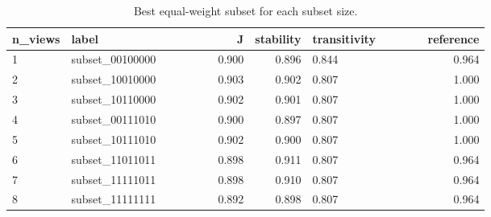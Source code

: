 \begin{table}[htbp]
\centering\scriptsize
\caption{Best equal-weight subset for each subset size.}
\label{tab:best_subset_per_size}
\setlength{\tabcolsep}{3pt}
\begin{tabular}{lp{0.381\linewidth}rrp{0.305\linewidth}r}
\toprule
n\_\allowbreak{}views & label & J & stability & transitivity & reference \\
\midrule
1 & subset\_\allowbreak{}00100000 & 0.900 & 0.896 & 0.844 & 0.964 \\
2 & subset\_\allowbreak{}10010000 & 0.903 & 0.902 & 0.807 & 1.000 \\
3 & subset\_\allowbreak{}10110000 & 0.902 & 0.901 & 0.807 & 1.000 \\
4 & subset\_\allowbreak{}00111010 & 0.900 & 0.897 & 0.807 & 1.000 \\
5 & subset\_\allowbreak{}10111010 & 0.902 & 0.900 & 0.807 & 1.000 \\
6 & subset\_\allowbreak{}11011011 & 0.898 & 0.911 & 0.807 & 0.964 \\
7 & subset\_\allowbreak{}11111011 & 0.898 & 0.910 & 0.807 & 0.964 \\
8 & subset\_\allowbreak{}11111111 & 0.892 & 0.898 & 0.807 & 0.964 \\
\bottomrule
\end{tabular}
\end{table}
